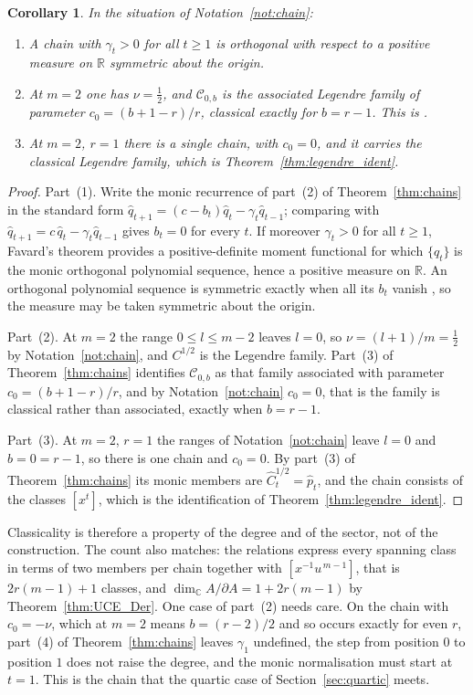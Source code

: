 \documentclass[11pt]{amsart}
\newtheorem{corollary}[theorem]{Corollary}
\theoremstyle{definition}
\theoremstyle{remark}
\newcommand{\C}{\mathbb{C}}
\newcommand{\R}{\mathbb{R}}
\newcommand{\pa}{\partial}
\begin{document}
\begin{corollary}\label{cor:chains}
In the situation of Notation~\ref{not:chain}:
\begin{enumerate}
\item A chain with $\gamma_t>0$ for all $t\geq1$ is orthogonal with respect to a
positive measure on $\R$ symmetric about the origin.
\item At $m=2$ one has $\nu=\tfrac12$, and $\mathcal C_{0,b}$ is the associated
Legendre family of parameter $c_0=(b+1-r)/r$, classical exactly for $b=r-1$.
This is \cite[\S2.4]{CoxZhao2018}.
\item At $m=2$, $r=1$ there is a single chain, with $c_0=0$, and it carries the
classical Legendre family, which is Theorem~\ref{thm:legendre_ident}.
\end{enumerate}
\end{corollary}

\begin{proof}
Part~(1). Write the monic recurrence of part~(2) of Theorem~\ref{thm:chains} in
the standard form $\hat q_{t+1}=(c-b_t)\hat q_t-\gamma_t\hat q_{t-1}$; comparing
with $\hat q_{t+1}=c\,\hat q_t-\gamma_t\hat q_{t-1}$ gives $b_t=0$ for every
$t$. If moreover $\gamma_t>0$ for all $t\geq1$, Favard's theorem
\cite[Ch.~I, Thm~4.4]{Chihara1978} provides a positive-definite moment
functional for which $\{\hat q_t\}$ is the monic orthogonal polynomial
sequence, hence a positive measure on $\R$. An orthogonal polynomial sequence
is symmetric exactly when all its $b_t$ vanish
\cite[Ch.~I, Thm~4.3]{Chihara1978}, so the measure may be taken symmetric about
the origin.

Part~(2). At $m=2$ the range $0\leq l\leq m-2$ leaves $l=0$, so
$\nu=(l+1)/m=\tfrac12$ by Notation~\ref{not:chain}, and $C^{1/2}$ is the
Legendre family. Part~(3) of Theorem~\ref{thm:chains} identifies
$\mathcal C_{0,b}$ as that family associated with parameter $c_0=(b+1-r)/r$,
and by Notation~\ref{not:chain} $c_0=0$, that is the family is classical rather
than associated, exactly when $b=r-1$.

Part~(3). At $m=2$, $r=1$ the ranges of Notation~\ref{not:chain} leave $l=0$ and
$b=0=r-1$, so there is one chain and $c_0=0$. By part~(3) of
Theorem~\ref{thm:chains} its monic members are $\hat C^{1/2}_t=\hat p_t$, and
the chain consists of the classes $[x^{t}]$, which is the identification of
Theorem~\ref{thm:legendre_ident}.
\end{proof}

Classicality is therefore a property of the degree and of the sector, not of the
construction. The count also matches: the relations express every spanning class
in terms of two members per chain together with $[x^{-1}u^{\,m-1}]$, that is
$2r(m-1)+1$ classes, and $\dim_\C A/\pa A=1+2r(m-1)$ by
Theorem~\ref{thm:UCE_Der}. One case of part~(2) needs care. On the chain with
$c_0=-\nu$, which at $m=2$ means $b=(r-2)/2$ and so occurs exactly for even $r$,
part~(4) of Theorem~\ref{thm:chains} leaves $\gamma_1$ undefined, the step from
position $0$ to position $1$ does not raise the degree, and the monic
normalisation must start at $t=1$. This is the chain that the quartic case of
Section~\ref{sec:quartic} meets.
\end{document}
